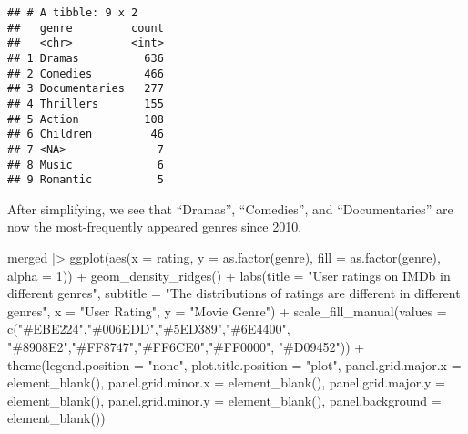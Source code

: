 \documentclass[
]{article}
\newenvironment{Shaded}{\begin{snugshade}}{\end{snugshade}}
\newcommand{\AttributeTok}[1]{\textcolor[rgb]{0.77,0.63,0.00}{#1}}
\newcommand{\DecValTok}[1]{\textcolor[rgb]{0.00,0.00,0.81}{#1}}
\newcommand{\FunctionTok}[1]{\textcolor[rgb]{0.00,0.00,0.00}{#1}}
\newcommand{\NormalTok}[1]{#1}
\newcommand{\SpecialCharTok}[1]{\textcolor[rgb]{0.00,0.00,0.00}{#1}}
\newcommand{\StringTok}[1]{\textcolor[rgb]{0.31,0.60,0.02}{#1}}
\begin{document}
\begin{verbatim}
## # A tibble: 9 x 2
##   genre         count
##   <chr>         <int>
## 1 Dramas          636
## 2 Comedies        466
## 3 Documentaries   277
## 4 Thrillers       155
## 5 Action          108
## 6 Children         46
## 7 <NA>              7
## 8 Music             6
## 9 Romantic          5
\end{verbatim}

After simplifying, we see that ``Dramas'', ``Comedies'', and
``Documentaries'' are now the most-frequently appeared genres since
2010.

\begin{Shaded}
\begin{Highlighting}[]
\NormalTok{merged }\SpecialCharTok{|\textgreater{}}
  \FunctionTok{ggplot}\NormalTok{(}\FunctionTok{aes}\NormalTok{(}\AttributeTok{x =}\NormalTok{ rating, }\AttributeTok{y =} \FunctionTok{as.factor}\NormalTok{(genre), }\AttributeTok{fill =} \FunctionTok{as.factor}\NormalTok{(genre), }\AttributeTok{alpha =} \DecValTok{1}\NormalTok{)) }\SpecialCharTok{+}
  \FunctionTok{geom\_density\_ridges}\NormalTok{() }\SpecialCharTok{+}
  \FunctionTok{labs}\NormalTok{(}\AttributeTok{title =} \StringTok{"User ratings on IMDb in different genres"}\NormalTok{,}
       \AttributeTok{subtitle =} \StringTok{"The distributions of ratings are different in different genres"}\NormalTok{,}
       \AttributeTok{x =} \StringTok{"User Rating"}\NormalTok{,}
       \AttributeTok{y =} \StringTok{"Movie Genre"}\NormalTok{) }\SpecialCharTok{+} 
   \FunctionTok{scale\_fill\_manual}\NormalTok{(}\AttributeTok{values =} \FunctionTok{c}\NormalTok{(}\StringTok{"\#EBE224"}\NormalTok{,}\StringTok{"\#006EDD"}\NormalTok{,}\StringTok{"\#5ED389"}\NormalTok{,}\StringTok{"\#6E4400"}\NormalTok{,}
                                \StringTok{"\#8908E2"}\NormalTok{,}\StringTok{"\#FF8747"}\NormalTok{,}\StringTok{"\#FF6CE0"}\NormalTok{,}\StringTok{"\#FF0000"}\NormalTok{,}
                                \StringTok{"\#D09452"}\NormalTok{)) }\SpecialCharTok{+} 
  \FunctionTok{theme}\NormalTok{(}\AttributeTok{legend.position =} \StringTok{"none"}\NormalTok{,}
        \AttributeTok{plot.title.position =} \StringTok{"plot"}\NormalTok{,}
        \AttributeTok{panel.grid.major.x =} \FunctionTok{element\_blank}\NormalTok{(),}
        \AttributeTok{panel.grid.minor.x =} \FunctionTok{element\_blank}\NormalTok{(),}
        \AttributeTok{panel.grid.major.y =} \FunctionTok{element\_blank}\NormalTok{(),}
        \AttributeTok{panel.grid.minor.y =} \FunctionTok{element\_blank}\NormalTok{(),}
        \AttributeTok{panel.background =} \FunctionTok{element\_blank}\NormalTok{())}
\end{Highlighting}
\end{Shaded}
\end{document}
